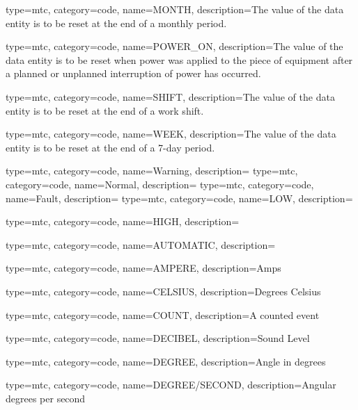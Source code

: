 {
  type=mtc,
  category=code,
  name={MONTH},
  description={The value of the \gls{data entity} is to be reset at the end of a monthly period.}
}

{
  type=mtc,
  category=code,
  name={POWER\_ON},
  description={The value of the \gls{data entity} is to be reset when power was applied to the piece of equipment after a planned or unplanned interruption of power has occurred.}
}

{
  type=mtc,
  category=code,
  name={SHIFT},
  description={The value of the \gls{data entity} is to be reset at the end of a work shift.}
}

{
  type=mtc,
  category=code,
  name={WEEK},
  description={The value of the \gls{data entity} is to be reset at the end of a 7-day period.}
}

{
  type=mtc,
  category=code,
  name={Warning},
  description={}
}
{
  type=mtc,
  category=code,
  name={Normal},
  description={}
}
{
  type=mtc,
  category=code,
  name={Fault},
  description={}
}
{
  type=mtc,
  category=code,
  name={LOW},
  description={}
}

{
  type=mtc,
  category=code,
  name={HIGH},
  description={}
}


{
  type=mtc,
  category=code,
  name={AUTOMATIC},
  description={}
}

{
  type=mtc,
  category=code,
  name={AMPERE},
  description={Amps}
}

{
  type=mtc,
  category=code,
  name={CELSIUS},
  description={Degrees Celsius}
}

{
  type=mtc,
  category=code,
  name={COUNT},
  description={A counted event}
}

{
  type=mtc,
  category=code,
  name={DECIBEL},
  description={Sound Level}
}

{
  type=mtc,
  category=code,
  name={DEGREE},
  description={Angle in degrees}
}

{
  type=mtc,
  category=code,
  name={DEGREE/SECOND},
  description={Angular degrees per second}
}

